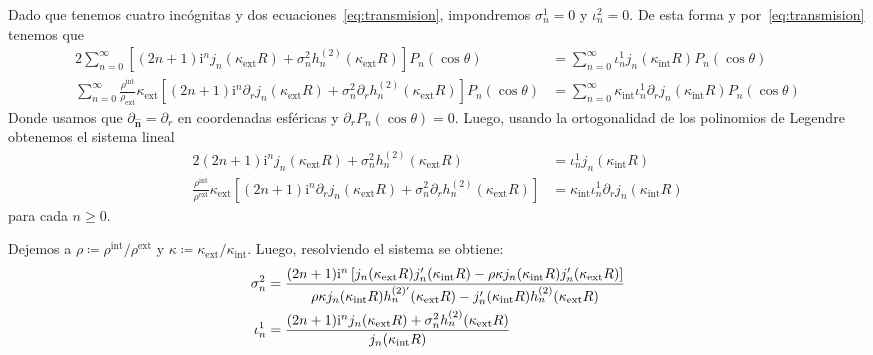 \documentclass[11pt]{article}
\numberwithin{equation}{section}
\def\n{\hat{\textbf{n}}}
\let\i\relax
\def\i{\mathrm{i}}
\def\exterior{\textrm{ext}}
\def\interior{\textrm{int}}
\begin{document}
Dado que tenemos cuatro incógnitas y dos ecuaciones~\eqref{eq:transmision}, impondremos
\(\sigma^{1}_{n} = 0\) y \(\iota^{2}_{n} = 0\). De esta forma y por~\eqref{eq:transmision}
tenemos que
\begin{alignat}{2}
	\sum_{n=0}^{\infty}
	\left[
		(2n + 1) \i^n j_{n}(\kappa_{\exterior} R)
		+
		\sigma^{2}_{n} h^{(2)}_{n}(\kappa_{\exterior} R)
	\right] P_{n}(\cos\theta)
	&=
	\sum_{n=0}^{\infty}
		\iota^{1}_{n} j_{n} (\kappa_{\interior} R)
		P_{n}(\cos\theta)
	\\
	\sum_{n=0}^{\infty}
	\frac{\rho^{\interior}}{\rho_{\exterior}}\kappa_{\exterior}
	\left[
		(2n + 1) \i^n \partial_{r} j_{n}(\kappa_{\exterior} R)
		+
		\sigma^{2}_{n} \partial_{r} h^{(2)}_{n}(\kappa_{\exterior} R)
	\right] P_{n}(\cos\theta)
	&=
	\sum_{n=0}^{\infty}
		\kappa_{\interior}
		\iota^{1}_{n} \partial_{r} j_{n} (\kappa_{\interior} R)
		P_{n}(\cos\theta)
\end{alignat}
Donde usamos que \(\partial_{\n} = \partial_{r}\) en coordenadas esféricas y
\(\partial_{r} P_{n}(\cos\theta) = 0\).
Luego, usando la ortogonalidad de los polinomios de Legendre obtenemos el 
sistema lineal
\begin{alignat}{2}
	(2n+1)\i^n j_{n}(\kappa_{\exterior} R)
	+
	\sigma^{2}_{n} h^{(2)}_{n}(\kappa_{\exterior} R)
	&=
	\iota^{1}_{n} j_{n}(\kappa_{\interior} R)
	\\
	\frac{\rho^{\interior}}{\rho^{\exterior}} \kappa_{\exterior}
	\left[
		(2n+1)\i^n \partial_{r} j_{n}(\kappa_{\exterior} R)
		+
		\sigma^{2}_{n} \partial_{r} h^{(2)}_{n}(\kappa_{\exterior} R)
	\right]
	&=
	\kappa_{\interior} \iota^{1}_{n} \partial_{r} j_{n}(\kappa_{\interior} R)
\end{alignat}
para cada \(n \ge 0\). 

Dejemos a \(\rho \coloneqq \rho^{\interior}/\rho^{\exterior}\) y \(\kappa
\coloneqq \kappa_{\exterior}/\kappa_{\interior}\). Luego, 
resolviendo el sistema se obtiene:
\begin{alignat}{2}
	\sigma^{2}_{n}
	&=
	\frac
	{%
		(2n+1) \i^n
		\left[
			j_n(\kappa_{\exterior} R)
			j'_{n}(\kappa_{\interior} R)
			-
			\rho \kappa
			j_{n}(\kappa_{\interior} R)
			j'_{n}(\kappa_{\exterior} R)
		\right]
	}
	{%
		\rho \kappa
		j_{n}(\kappa_{\interior} R)
		h^{(2)'}_{n}(\kappa_{\exterior} R)
		-
		j'_{n}(\kappa_{\interior} R)
		h^{(2)}_{n}(\kappa_{\exterior} R)
	}
	\\
	\iota^{1}_{n}
	&=
	\frac
		{(2n + 1) \i^n j_n(\kappa_{\exterior} R) + \sigma^{2}_{n} h^{(2)}_{n} (\kappa_{\exterior} R)}
		{j_{n}(\kappa_{\interior} R)}
\end{alignat}
\end{document}
